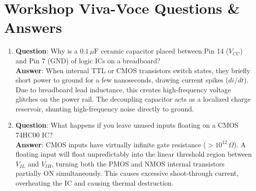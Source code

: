 \section{Workshop Viva-Voce Questions \& Answers}
\begin{enumerate}[leftmargin=1.5em]
    \item \textbf{Question}: Why is a $0.1\,\mu\mathrm{F}$ ceramic capacitor placed between Pin 14 ($V_{CC}$) and Pin 7 (GND) of logic ICs on a breadboard?\\
    \textbf{Answer}: When internal TTL or CMOS transistors switch states, they briefly short power to ground for a few nanoseconds, drawing current spikes ($di/dt$). Due to breadboard lead inductance, this creates high-frequency voltage glitches on the power rail. The decoupling capacitor acts as a localized charge reservoir, shunting high-frequency noise directly to ground.
    \item \textbf{Question}: What happens if you leave unused inputs floating on a CMOS 74HC00 IC?\\
    \textbf{Answer}: CMOS inputs have virtually infinite gate resistance ($> 10^{12}\,\Omega$). A floating input will float unpredictably into the linear threshold region between $V_{IL}$ and $V_{IH}$, turning both the PMOS and NMOS internal transistors partially ON simultaneously. This causes excessive shoot-through current, overheating the IC and causing thermal destruction.
\end{enumerate}
